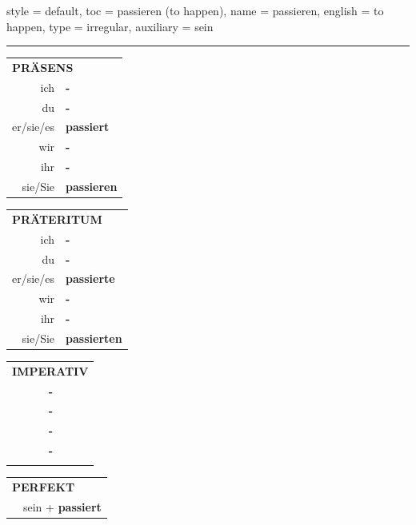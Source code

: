 \begin{verbentry}{
  style = {default},
  toc = {passieren (to happen)},
  name = {passieren},
  english = {to happen},
  type = {irregular},
  auxiliary = {sein}
}
 
    
     \vspace{5pt}

    \hrule
    
    \vspace{5pt}

  \begin{tabular}{rl}
     \multicolumn{2}{l}{\textbf{PRÄSENS} }\\
    ich & \textbf{-}\\
    du & \textbf{-}\\
    er/sie/es & \textbf{passiert}\\
    wir & \textbf{-}\\
    ihr & \textbf{-}\\
    sie/Sie & \textbf{passieren}\\
  \end{tabular}
  \hfill
     \begin{tabular}{rl}
    \multicolumn{2}{l}{\textbf{PRÄTERITUM} }\\
    ich & \textbf{-}\\
    du & \textbf{-}\\
    er/sie/es & \textbf{passierte}\\
    wir & \textbf{-}\\
    ihr & \textbf{-}\\
    sie/Sie & \textbf{passierten}\\
  \end{tabular}
  \hfill
  \begin{tabular}{rl}
     \multicolumn{2}{l}{\textbf{IMPERATIV} }\\
   & \textbf{-}\\
   & \textbf{-}\\
   & \textbf{-}\\
   & \textbf{-}\\
   & \vspace{10pt}
  \end{tabular}

    \vspace{10pt}

 \begin{tabular}{rl}
     \multicolumn{2}{l}{\textbf{PERFEKT}}\\
   & sein + \textbf{passiert}\\
  \end{tabular}
\hfill
   \begin{tabular}{rl}
   

\end{tabular}
\end{verbentry}
